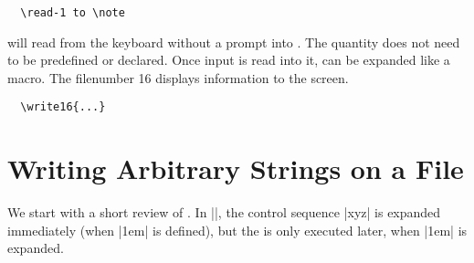 \begin{Verbatim}
  \read-1 to \note
\end{Verbatim}

will read from the keyboard without a prompt into . The quantity  does not need to be predefined
or declared. Once input is read into it,   can be expanded like a macro.
The filenumber 16 displays information to the screen.

\begin{Verbatim}
  \write16{...}
\end{Verbatim}


\section{Writing Arbitrary Strings on a File}

We start with a short review of . In |\edef\abc{\xyz \kern1em}|, the control 
sequence |xyz| is expanded immediately (when |\abc| is defined), but the 
 is only executed later, when |\abc| is expanded.



































